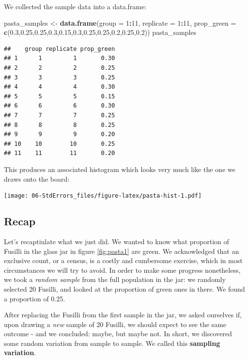 \documentclass[]{book}
\newenvironment{Shaded}{\begin{snugshade}}{\end{snugshade}}
\newcommand{\KeywordTok}[1]{\textcolor[rgb]{0.13,0.29,0.53}{\textbf{#1}}}
\newcommand{\DataTypeTok}[1]{\textcolor[rgb]{0.13,0.29,0.53}{#1}}
\newcommand{\DecValTok}[1]{\textcolor[rgb]{0.00,0.00,0.81}{#1}}
\newcommand{\FloatTok}[1]{\textcolor[rgb]{0.00,0.00,0.81}{#1}}
\newcommand{\StringTok}[1]{\textcolor[rgb]{0.31,0.60,0.02}{#1}}
\newcommand{\OperatorTok}[1]{\textcolor[rgb]{0.81,0.36,0.00}{\textbf{#1}}}
\newcommand{\NormalTok}[1]{#1}
\begin{document}
We collected the sample data into a data.frame:

\begin{Shaded}
\begin{Highlighting}[]
\NormalTok{pasta_samples <-}\StringTok{ }\KeywordTok{data.frame}\NormalTok{(}\DataTypeTok{group =} \DecValTok{1}\OperatorTok{:}\DecValTok{11}\NormalTok{, }\DataTypeTok{replicate =} \DecValTok{1}\OperatorTok{:}\DecValTok{11}\NormalTok{, }\DataTypeTok{prop_green =} \KeywordTok{c}\NormalTok{(}\FloatTok{0.3}\NormalTok{,}\FloatTok{0.25}\NormalTok{,}\FloatTok{0.25}\NormalTok{,}\FloatTok{0.3}\NormalTok{,}\FloatTok{0.15}\NormalTok{,}\FloatTok{0.3}\NormalTok{,}\FloatTok{0.25}\NormalTok{,}\FloatTok{0.25}\NormalTok{,}\FloatTok{0.2}\NormalTok{,}\FloatTok{0.25}\NormalTok{,}\FloatTok{0.2}\NormalTok{))}
\NormalTok{pasta_samples}
\end{Highlighting}
\end{Shaded}

\begin{verbatim}
##    group replicate prop_green
## 1      1         1       0.30
## 2      2         2       0.25
## 3      3         3       0.25
## 4      4         4       0.30
## 5      5         5       0.15
## 6      6         6       0.30
## 7      7         7       0.25
## 8      8         8       0.25
## 9      9         9       0.20
## 10    10        10       0.25
## 11    11        11       0.20
\end{verbatim}

This produces an associated histogram which looks very much like the one
we draws onto the board:

\texttt{[image: 06-StdErrors\_files/figure-latex/pasta-hist-1.pdf]}

\subsection{Recap}\label{recap}

Let's recaptiulate what we just did. We wanted to know what proportion
of Fusilli in the glass jar in figure \ref{fig:pasta1} are green. We
acknowledged that an exclusive count, or a census, is a costly and
cumbersome exercise, which in most circumstances we will try to avoid.
In order to make some progress nonetheless, we took a \emph{random
sample} from the full population in the jar: we randomly selected 20
Fusilli, and looked at the proportion of green ones in there. We found a
proportion of 0.25.

After replacing the Fusilli from the first sample in the jar, we asked
ourselves if, upon drawing a \emph{new} sample of 20 Fusilli, we should
expect to see the same outcome - and we concluded: maybe, but maybe not.
In short, we discovered some random variation from sample to sample. We
called this \textbf{sampling variation}.
\end{document}
